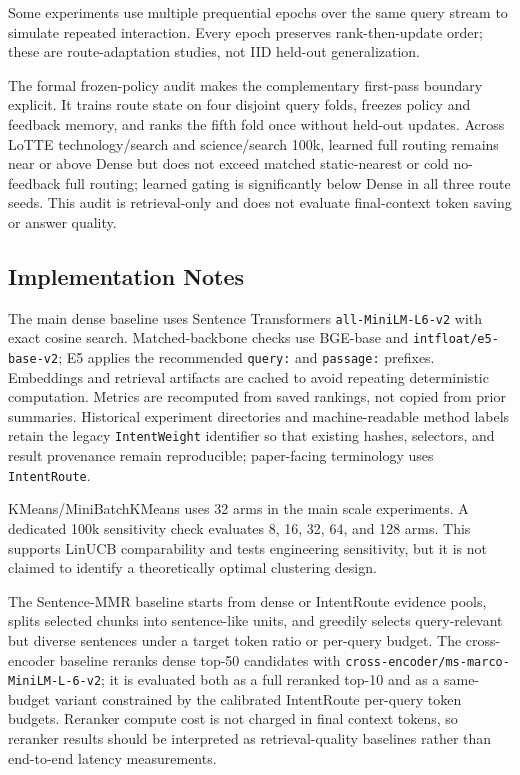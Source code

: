 Some experiments use multiple prequential epochs over the same query stream to simulate repeated interaction. Every epoch preserves rank-then-update order; these are route-adaptation studies, not IID held-out generalization.

The formal frozen-policy audit makes the complementary first-pass boundary explicit. It trains route state on four disjoint query folds, freezes policy and feedback memory, and ranks the fifth fold once without held-out updates. Across LoTTE technology/search and science/search 100k, learned full routing remains near or above Dense but does not exceed matched static-nearest or cold no-feedback full routing; learned gating is significantly below Dense in all three route seeds. This audit is retrieval-only and does not evaluate final-context token saving or answer quality.

\subsection{Implementation Notes}
\label{sec:05-experimental-setup:implementation-notes}

The main dense baseline uses Sentence Transformers \nolinkurl{all-MiniLM-L6-v2} with exact cosine search. Matched-backbone checks use BGE-base and \nolinkurl{intfloat/e5-base-v2}; E5 applies the recommended \nolinkurl{query:} and \nolinkurl{passage:} prefixes. Embeddings and retrieval artifacts are cached to avoid repeating deterministic computation. Metrics are recomputed from saved rankings, not copied from prior summaries. Historical experiment directories and machine-readable method labels retain the legacy \nolinkurl{IntentWeight} identifier so that existing hashes, selectors, and result provenance remain reproducible; paper-facing terminology uses \nolinkurl{IntentRoute}.

KMeans/MiniBatchKMeans uses 32 arms in the main scale experiments. A dedicated 100k sensitivity check evaluates 8, 16, 32, 64, and 128 arms. This supports LinUCB comparability and tests engineering sensitivity, but it is not claimed to identify a theoretically optimal clustering design.

The Sentence-MMR baseline starts from dense or IntentRoute evidence pools, splits selected chunks into sentence-like units, and greedily selects query-relevant but diverse sentences under a target token ratio or per-query budget. The cross-encoder baseline reranks dense top-50 candidates with \nolinkurl{cross-encoder/ms-marco-MiniLM-L-6-v2}; it is evaluated both as a full reranked top-10 and as a same-budget variant constrained by the calibrated IntentRoute per-query token budgets. Reranker compute cost is not charged in final context tokens, so reranker results should be interpreted as retrieval-quality baselines rather than end-to-end latency measurements.

